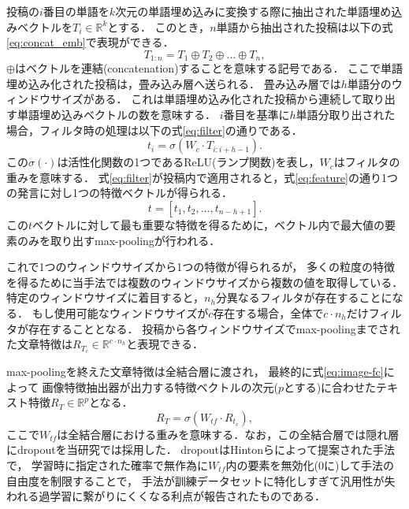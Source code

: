 投稿の$i$番目の単語を$k$次元の単語埋め込みに変換する際に抽出された単語埋め込みベクトルを$T_i \in \mathbb{R}^k$とする．
このとき，$n$単語から抽出された投稿は以下の式\ref{eq:concat_emb}で表現ができる．
\begin{equation}
    \label{eq:concat_emb}
    T_{1:n} = T_1 \oplus T_2 \oplus \ldots \oplus T_n,
\end{equation}
$\oplus$はベクトルを連結(concatenation)することを意味する記号である．
ここで単語埋め込み化された投稿は，畳み込み層へ送られる．
畳み込み層では$h$単語分のウィンドウサイズがある．
これは単語埋め込み化された投稿から連続して取り出す単語埋め込みベクトルの数を意味する．
$i$番目を基準に$h$単語分取り出された場合，フィルタ時の処理は以下の式\ref{eq:filter}の通りである．
\begin{equation}
    \label{eq:filter}
    t_i = \sigma(W_c \cdot T_{i:i+h-1}).
\end{equation}
この$\sigma(\cdot)$は活性化関数の1つであるReLU(ランプ関数)を表し，$W_c$はフィルタの重みを意味する．
式\ref{eq:filter}が投稿内で適用されると，式\ref{eq:feature}の通り1つの発言に対し1つの特徴ベクトルが得られる．
\begin{equation}
    \label{eq:feature}
    t = [t_1, t_2, \ldots, t_{n-h+1}].
\end{equation}
この$t$ベクトルに対して最も重要な特徴を得るために，ベクトル内で最大値の要素のみを取り出すmax-poolingが行われる．

これで1つのウィンドウサイズから1つの特徴が得られるが，
多くの粒度の特徴を得るために当手法では複数のウィンドウサイズから複数の値を取得している．
特定のウィンドウサイズに着目すると，$n_h$分異なるフィルタが存在することになる．
もし使用可能なウィンドウサイズが$c$存在する場合，全体で$c \cdot n_h$だけフィルタが存在することとなる．
投稿から各ウィンドウサイズでmax-poolingまでされた文章特徴は$R_{T_c} \in \mathbb{R}^{c \cdot n_h}$と表現できる．

max-poolingを終えた文章特徴は全結合層に渡され，
最終的に式\ref{eq:image-fc}によって
画像特徴抽出器が出力する特徴ベクトルの次元($p$とする)に合わせたテキスト特徴$R_T \in \mathbb{R}^p$となる．
\begin{equation}
    \label{eq:image-fc}
    R_T = \sigma(W_{tf} \cdot R_{t_c}),
\end{equation}
ここで$W_{tf}$は全結合層における重みを意味する．なお，この全結合層では隠れ層にdropoutを当研究では採用した．
dropoutはHintonらによって提案された手法\cite{JMLR:v15:srivastava14a}で，
学習時に指定された確率で無作為に$W_{tf}$内の要素を無効化(0に)して手法の自由度を制限することで，
手法が訓練データセットに特化しすぎて汎用性が失われる過学習に繋がりにくくなる利点が報告されたものである．

